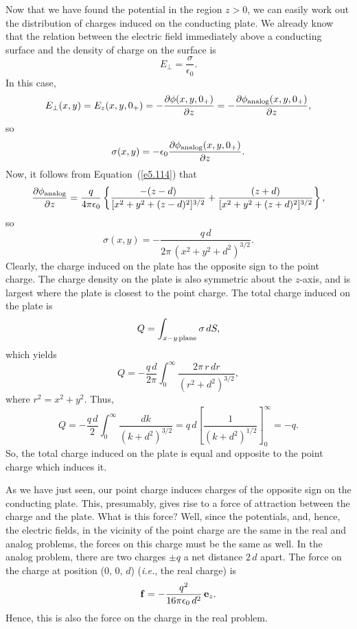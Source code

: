 Now that we have found the potential in the region $z>0$, we can easily work
out the distribution of charges induced on the conducting plate. We already
know that the relation between the electric 
field immediately above a conducting surface
and the density of charge on the surface is
\begin{equation}
E_\perp = \frac{\sigma}{\epsilon_0}.
\end{equation}
In this case,
\begin{equation}
E_\perp (x,y)= E_z(x,y,0_+) = - \frac{\partial \phi(x,y,0_+)}{\partial z}
= - \frac{\partial \phi_{\rm analog}(x,y,0_+)}{\partial z},
\end{equation}
so
\begin{equation}
\sigma(x,y) = - \epsilon_0 \frac{\partial\phi_{\rm analog}(x,y,0_+)}{\partial z}.
\end{equation}
Now, it follows from Equation~(\ref{e5.114}) that
\begin{equation}
\frac{\partial\phi_{\rm analog}}{\partial z} = \frac{q}{4\pi\epsilon_0} \left\{
\frac{-(z-d)}{[x^2+y^2+(z-d)^2]^{3/2}} +
\frac{(z+d)}{[x^2+y^2+(z+d)^2]^{3/2}}\right\},
\end{equation}
so
\begin{equation}
\sigma(x,y) = - \frac{q\,d}{2\pi\, (x^2+y^2+d^2)^{3/2}}.
\end{equation}
Clearly, the charge induced on the plate has the opposite sign to the point charge.
The charge density on the plate is also symmetric about the $z$-axis, and is largest
where the plate is closest to the point charge. The total charge induced on the
plate is
\begin{equation}
Q = \int_{x-y \,\rm plane} \sigma\,dS,
\end{equation}
which yields
\begin{equation}
Q = - \frac{q\,d}{2\pi} \int_0^\infty \frac{2\pi\, r\,dr}{(r^2+d^2)^{3/2}},
\end{equation}
where $r^2 = x^2+y^2$. Thus,
\begin{equation}
Q = - \frac{q\,d}{2} \int_0^\infty \frac{dk}{(k+d^2)^{3/2}}
= q\,d\left[ \frac{1}{(k+d^2)^{1/2}}\right]_0^\infty = - q.
\end{equation}
So, the total charge induced on the plate is equal and opposite to the point charge which induces it.

As we have just seen, our point charge induces charges of the opposite sign on the conducting plate.
This, presumably, gives rise to a force of attraction between the charge and the 
plate. What is this force? Well, since the potentials, and, hence, the electric
fields, in  the vicinity of the point charge are the same in the real and analog problems,
 the forces on this charge must be the same as well. In the analog problem,
there are two charges $\pm q$ a net distance $2\,d$ apart. The force on
the charge at position (0, 0, $d$) ({\em i.e.}, the real charge) is
\begin{equation}
{\bf f} = -  \frac{q^2}{16\pi\epsilon_0\,d^2} \,{\bf e}_z.
\end{equation}
Hence, this is also the force on the charge in the real problem.

